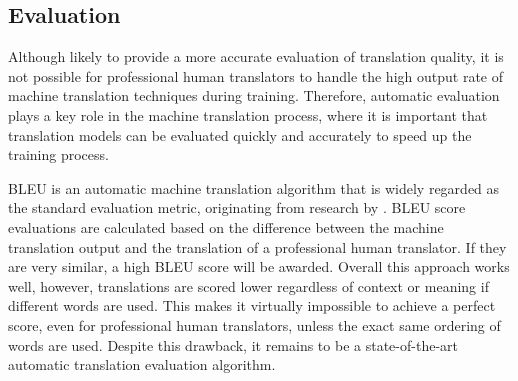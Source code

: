 \clearpage
\subsection{Evaluation}

Although likely to provide a more accurate evaluation of translation quality, it is not possible for professional human translators to handle the high output rate of machine translation techniques during training. Therefore, automatic evaluation plays a key role in the machine translation process, where it is important that translation models can be evaluated quickly and accurately to speed up the training process.

\acrfull{BLEU} is an automatic machine translation algorithm that is widely regarded as the standard evaluation metric, originating from research by \cite{papineni_bleu_2001}. \acrshort{BLEU} score evaluations are calculated based on the difference between the machine translation output and the translation of a professional human translator. If they are very similar, a high \acrshort{BLEU} score will be awarded. Overall this approach works well, however, translations are scored lower regardless of context or meaning if different words are used. This makes it virtually impossible to achieve a perfect score, even for professional human translators, unless the exact same ordering of words are used. Despite this drawback, it remains to be a state-of-the-art automatic translation evaluation algorithm.







